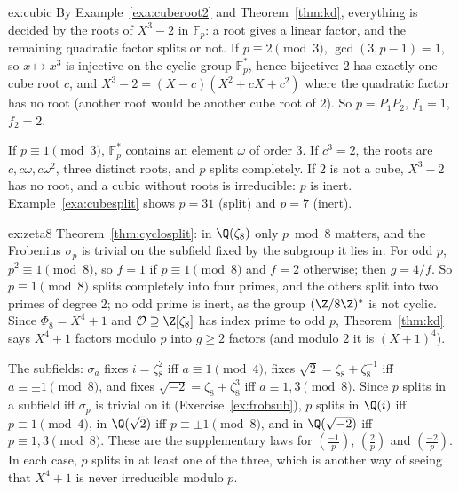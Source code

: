 \begin{solution}{ex:cubic}
\idea By Example~\ref{exa:cuberoot2} and Theorem~\ref{thm:kd}, everything is decided by the roots of $X^3-2$ in
$\mathbb F_p$: a root gives a linear factor, and the remaining quadratic factor splits or not.
\writeup If $p\equiv2\pmod3$, $\gcd(3,p-1)=1$, so $x\mapsto x^3$ is injective on the cyclic group $\mathbb F_p^*$, hence
bijective: $2$ has exactly one cube root $c$, and $X^3-2=(X-c)(X^2+cX+c^2)$ where the quadratic factor has no root
(another root would be another cube root of $2$). So $p=P_1P_2$, $f_1=1$, $f_2=2$.

If $p\equiv1\pmod 3$, $\mathbb F_p^*$ contains an element $\omega$ of order $3$. If $c^3=2$, the roots are $c,c\omega,c
\omega^2$, three distinct roots, and $p$ splits completely. If $2$ is not a cube, $X^3-2$ has no root, and a cubic without
roots is irreducible: $p$ is inert. Example~\ref{exa:cubesplit} shows $p=31$ (split) and $p=7$ (inert).
\end{solution}

\begin{solution}{ex:zeta8}
\idea Theorem~\ref{thm:cyclosplit}: in $\Q(\zeta_8)$ only $p\bmod 8$ matters, and the Frobenius $\sigma_p$ is trivial on
the subfield fixed by the subgroup it lies in.
\writeup For odd $p$, $p^2\equiv1\pmod 8$, so $f=1$ if $p\equiv1\pmod 8$ and $f=2$ otherwise; then $g=4/f$. So $p\equiv1
\pmod8$ splits completely into four primes, and the others split into two primes of degree $2$; no odd prime is inert,
as the group $(\Z/8\Z)^*$ is not cyclic. Since $\Phi_8=X^4+1$ and $\mathcal O\supseteq\Z[\zeta_8]$ has index prime to odd
$p$, Theorem~\ref{thm:kd} says $X^4+1$ factors modulo $p$ into $g\ge2$ factors (and modulo $2$ it is $(X+1)^4$).

The subfields: $\sigma_a$ fixes $i=\zeta_8^2$ iff $a\equiv1\pmod4$, fixes $\sqrt2=\zeta_8+\zeta_8^{-1}$ iff $a\equiv\pm1
\pmod8$, and fixes $\sqrt{-2}=\zeta_8+\zeta_8^3$ iff $a\equiv1,3\pmod 8$. Since $p$ splits in a subfield iff $\sigma_p$ is
trivial on it (Exercise~\ref{ex:frobsub}), $p$ splits in $\Q(i)$ iff $p\equiv1\pmod 4$, in $\Q(\sqrt2)$ iff $p\equiv\pm1
\pmod 8$, and in $\Q(\sqrt{-2})$ iff $p\equiv1,3\pmod8$. These are the supplementary laws for $\left(\frac{-1}p\right)$,
$\left(\frac2p\right)$ and $\left(\frac{-2}p\right)$. In each case, $p$ splits in at least one of the three, which is
another way of seeing that $X^4+1$ is never irreducible modulo $p$.
\end{solution}

